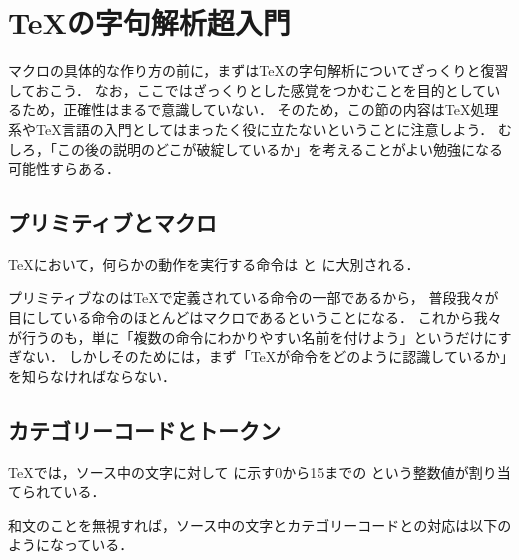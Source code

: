 \chapter{{\TeX}の字句解析超入門} \label{sec:seq}

マクロの具体的な作り方の前に，まずは{\TeX}の字句解析についてざっくりと復習しておこう．
なお，ここではざっくりとした感覚をつかむことを目的としているため，正確性はまるで意識していない．
そのため，この節の内容は{\TeX}処理系や{\TeX}言語の入門としてはまったく役に立たないということに注意しよう．
むしろ，「この後の説明のどこが破綻しているか」を考えることがよい勉強になる可能性すらある．

\section{プリミティブとマクロ} \label{sec:primitive}

{\TeX}において，何らかの動作を実行する命令は%
%
%
と%
%
%
に大別される．

プリミティブなのは{\TeX}で定義されている命令の一部であるから，
普段我々が目にしている命令のほとんどはマクロであるということになる．
これから我々が行うのも，単に「複数の命令にわかりやすい名前を付けよう」というだけにすぎない．
しかしそのためには，まず「{\TeX}が命令をどのように認識しているか」を知らなければならない．

\section{カテゴリーコードとトークン} \label{sec:categorycode}

{\TeX}では，ソース中の文字に対して%
に示す0から15までの
%
という整数値が割り当てられている．

和文のことを無視すれば，ソース中の文字とカテゴリーコードとの対応は以下のようになっている．

